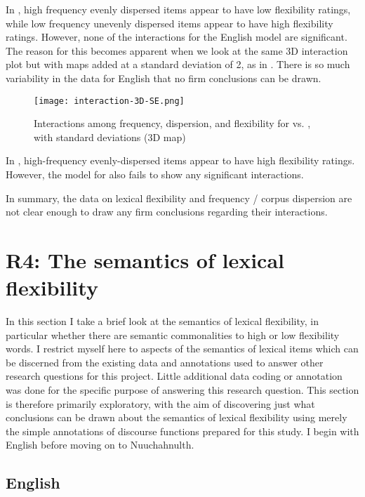 In , high frequency evenly dispersed items appear to have low flexibility ratings, while low frequency unevenly dispersed items appear to have high flexibility ratings. However, none of the interactions for the English model are significant. The reason for this becomes apparent when we look at the same 3D interaction plot but with maps added at a standard deviation of 2, as in . There is so much variability in the data for English that no firm conclusions can be drawn.

\begin{figure}
  \centering
  \caption{Interactions among frequency, dispersion, and flexibility for  vs. , with standard deviations (3D map)}
  \label{fig:interaction-3D-SD}
  \texttt{[image: interaction-3D-SE.png]}
\end{figure}

In , high-frequency evenly-dispersed items appear to have high flexibility ratings. However, the model for  also fails to show any significant interactions.

In summary, the data on lexical flexibility and frequency / corpus dispersion are not clear enough to draw any firm conclusions regarding their interactions.

\section{R4: The semantics of lexical flexibility}
\label{sec:4.6}

In this section I take a brief look at the semantics of lexical flexibility, in particular whether there are semantic commonalities to high or low flexibility words. I restrict myself here to aspects of the semantics of lexical items which can be discerned from the existing data and annotations used to answer other research questions for this project. Little additional data coding or annotation was done for the specific purpose of answering this research question. This section is therefore primarily exploratory, with the aim of discovering just what conclusions can be drawn about the semantics of lexical flexibility using merely the simple annotations of discourse functions prepared for this study. I begin with English before moving on to Nuuchahnulth.

\subsection{English}
\label{sec:4.6.1}

